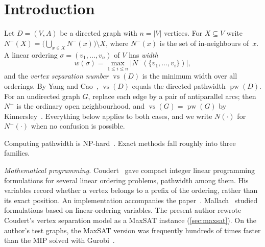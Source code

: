 \documentclass[11pt]{article}
\theoremstyle{definition}
\newcommand{\Nm}{N^{-}}
\newcommand{\vs}{\operatorname{vs}}
\newcommand{\pw}{\operatorname{pw}}
\newcommand{\cost}{w}
\newcommand{\set}[1]{\{#1\}}
\begin{document}
\begin{abstract}
Finally, we ask which of these ideas apply to other width parameters. Both
greedy rules used for pathwidth are instances of one lemma: for a
submodular prefix cost, a vertex whose addition does not increase the cost
can be added at once. For vertex separation, the two rules together are
exactly the non-increasing additions. The lemma also applies to cutwidth.
Combined with the vertex-cover normal form of Cygan, Lokshtanov, Pilipczuk,
Pilipczuk and Saurabh, the same one-pass search computes cutwidth exactly
over at most $2^{\tau}$ states, and in a Python prototype it gives the
cutwidth of the square-sum graph on $\{1,\dots,60\}$. For treewidth, the
search applies to elimination orderings but its greedy rules are weak.
Bandwidth does not fit the framework, because its cost depends on positions
and not on prefix sets.
\end{abstract}

\section{Introduction}

Let $D=(V,A)$ be a directed graph with $n=|V|$ vertices. For $X\subseteq V$
write $\Nm(X)=\bigl(\bigcup_{x\in X}\Nm(x)\bigr)\setminus X$, where $\Nm(x)$
is the set of in-neighbours of~$x$. A linear ordering $\sigma=(v_1,\dots,v_n)$
of $V$ has \emph{width}
\[
  \cost(\sigma)=\max_{1\le i\le n}\bigl|\Nm(\set{v_1,\dots,v_i})\bigr|,
\]
and the \emph{vertex separation number} $\vs(D)$ is the minimum width over
all orderings. By Yang and Cao~\cite{YC08}, $\vs(D)$ equals the directed
pathwidth $\pw(D)$. For an undirected graph $G$, replace each edge by a pair
of antiparallel arcs; then $\Nm$ is the ordinary open neighbourhood, and
$\vs(G)=\pw(G)$ by Kinnersley~\cite{Kin92}. Everything below applies to both
cases, and we write $N(\cdot)$ for $\Nm(\cdot)$ when no confusion is possible.

Computing pathwidth is NP-hard~\cite{KF79}. Exact methods fall roughly into
three families.

\emph{Mathematical programming.} Coudert~\cite{Cou16} gave compact integer
linear programming formulations for several linear ordering problems,
pathwidth among them. His variables record whether a vertex belongs to a
prefix of the ordering, rather than its exact position. An implementation
accompanies the paper~\cite{CouCode}. Mallach~\cite{Mal18} studied
formulations based on linear-ordering variables. The present author
rewrote Coudert's vertex separation model as a MaxSAT instance
(\cref{sec:maxsat}). On the author's test graphs, the MaxSAT version was frequently hundreds of times
faster than the MIP solved with Gurobi~\cite{Gurobi}.
\end{document}
